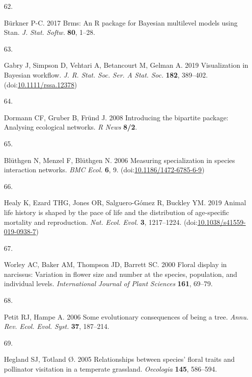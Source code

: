 \documentclass[
  12pt,
  a4paper,
]{article}
\newlength{\cslhangindent}
\newlength{\csllabelwidth}
\newlength{\cslentryspacingunit} %
\newenvironment{CSLReferences}[2] %
 {%
  \setlength{\parindent}{0pt}
  \ifodd #1
  \let\oldpar\par
  \def\par{\hangindent=\cslhangindent\oldpar}
  \fi
  \setlength{\parskip}{#2\cslentryspacingunit}
 }%
 {}
\newcommand{\CSLLeftMargin}[1]{\parbox[t]{\csllabelwidth}{#1}}
\newcommand{\CSLRightInline}[1]{\parbox[t]{\linewidth - \csllabelwidth}{#1}\break}
\begin{document}
\begin{CSLReferences}{0}{0}
\leavevmode{}%
\CSLLeftMargin{62. }
\CSLRightInline{Bürkner P-C. 2017 Brms: {An R} package for {Bayesian} multilevel models using {Stan}. \emph{J. Stat. Softw.} \textbf{80}, 1--28.}

\leavevmode{}%
\CSLLeftMargin{63. }
\CSLRightInline{Gabry J, Simpson D, Vehtari A, Betancourt M, Gelman A. 2019 Visualization in {Bayesian} workflow. \emph{J. R. Stat. Soc. Ser. A Stat. Soc.} \textbf{182}, 389--402. (doi:\href{https://doi.org/10.1111/rssa.12378}{10.1111/rssa.12378})}

\leavevmode{}%
\CSLLeftMargin{64. }
\CSLRightInline{Dormann CF, Gruber B, Fründ J. 2008 Introducing the bipartite package: Analysing ecological networks. \emph{R News} \textbf{8/2}.}

\leavevmode{}%
\CSLLeftMargin{65. }
\CSLRightInline{Blüthgen N, Menzel F, Blüthgen N. 2006 Measuring specialization in species interaction networks. \emph{BMC Ecol.} \textbf{6}, 9. (doi:\href{https://doi.org/10.1186/1472-6785-6-9}{10.1186/1472-6785-6-9})}

\leavevmode{}%
\CSLLeftMargin{66. }
\CSLRightInline{Healy K, Ezard THG, Jones OR, Salguero-Gómez R, Buckley YM. 2019 Animal life history is shaped by the pace of life and the distribution of age-specific mortality and reproduction. \emph{Nat. Ecol. Evol.} \textbf{3}, 1217--1224. (doi:\href{https://doi.org/10.1038/s41559-019-0938-7}{10.1038/s41559-019-0938-7})}

\leavevmode{}%
\CSLLeftMargin{67. }
\CSLRightInline{Worley AC, Baker AM, Thompson JD, Barrett SC. 2000 Floral display in narcissus: Variation in flower size and number at the species, population, and individual levels. \emph{International Journal of Plant Sciences} \textbf{161}, 69--79.}

\leavevmode{}%
\CSLLeftMargin{68. }
\CSLRightInline{Petit RJ, Hampe A. 2006 Some evolutionary consequences of being a tree. \emph{Annu. Rev. Ecol. Evol. Syst.} \textbf{37}, 187--214.}

\leavevmode{}%
\CSLLeftMargin{69. }
\CSLRightInline{Hegland SJ, Totland Ø. 2005 Relationships between species' floral traits and pollinator visitation in a temperate grassland. \emph{Oecologia} \textbf{145}, 586--594.}


\end{CSLReferences}
\end{document}
